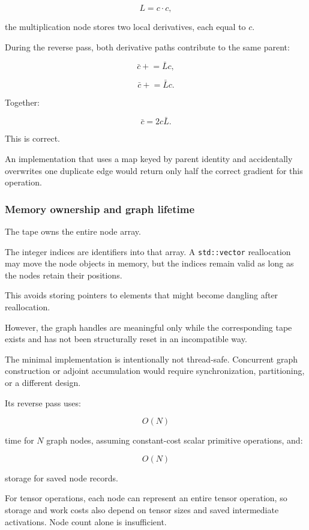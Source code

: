 \[
L=c\cdot c,
\]

the multiplication node stores two local derivatives, each equal to \(c\).

During the reverse pass, both derivative paths contribute to the same parent:

\[
\bar c\mathrel{+}=\bar Lc,
\]

\[
\bar c\mathrel{+}=\bar Lc.
\]

Together:

\[
\bar c=2c\bar L.
\]

This is correct.

An implementation that uses a map keyed by parent identity and accidentally overwrites one duplicate edge would return only half the correct gradient for this operation.

\subsubsection{Memory ownership and graph lifetime}\label{02-foundations-ii-ch022-memory-ownership-and-graph-lifetime}

The tape owns the entire node array.

The integer indices are identifiers into that array. A \texttt{std::vector} reallocation may move the node objects in memory, but the indices remain valid as long as the nodes retain their positions.

This avoids storing pointers to elements that might become dangling after reallocation.

However, the graph handles are meaningful only while the corresponding tape exists and has not been structurally reset in an incompatible way.

The minimal implementation is intentionally not thread-safe. Concurrent graph construction or adjoint accumulation would require synchronization, partitioning, or a different design.

Its reverse pass uses:

\[
O(N)
\]

time for \(N\) graph nodes, assuming constant-cost scalar primitive operations, and:

\[
O(N)
\]

storage for saved node records.

For tensor operations, each node can represent an entire tensor operation, so storage and work costs also depend on tensor sizes and saved intermediate activations. Node count alone is insufficient.

